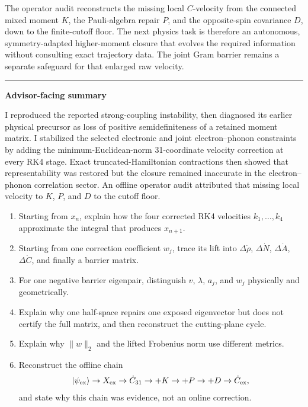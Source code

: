 \documentclass[10pt,letterpaper,twocolumn]{article}
\newcommand{\segmenthead}[1]{%
  \Needspace{5\baselineskip}%
  \par\medskip{\color{navy}\large\bfseries #1}\par
  \vspace{-2pt}{\color{navy}\rule{\columnwidth}{0.7pt}}\par\smallskip
}
\newcommand{\teachbox}[2]{%
  \par\smallskip
  \noindent\begin{minipage}{\columnwidth}
    {\color{#1}\rule{\columnwidth}{1.0pt}}\par\vspace{-1pt}
    \small\textbf{\color{#1}#2}\par\smallskip\color{black}
}
\newcommand{\closeteachbox}{%
  \par\vspace{1pt}{\color{navy!35}\rule{\columnwidth}{0.35pt}}
  \end{minipage}\par\smallskip
}
\begin{document}
The operator audit reconstructs the missing local \(C\)-velocity from the
connected mixed moment \(K\), the Pauli-algebra repair \(P\), and the
opposite-spin covariance \(D\), down to the finite-cutoff floor.  The next
physics task is therefore an autonomous, symmetry-adapted higher-moment
closure that evolves the required information without consulting exact
trajectory data.  The joint Gram barrier remains a separate safeguard for
that enlarged raw velocity.

\teachbox{green}{Advisor-facing summary}
I reproduced the reported strong-coupling instability, then diagnosed its
earlier physical precursor as loss of positive semidefiniteness of a retained
moment matrix.  I stabilized the selected electronic and joint
electron--phonon constraints by adding the minimum-Euclidean-norm
31-coordinate velocity correction at every RK4 stage.  Exact
truncated-Hamiltonian contractions then showed that representability was
restored but the closure remained inaccurate in the electron--phonon
correlation sector.  An offline operator audit attributed that missing local
velocity to \(K\), \(P\), and \(D\) to the cutoff floor.
\closeteachbox

\segmenthead{Questions for later oral review}

\begin{enumerate}
  \item Starting from \(x_n\), explain how the four corrected RK4 velocities
  \(k_1,\ldots,k_4\) approximate the integral that produces \(x_{n+1}\).
  \item Starting from one correction coefficient \(w_j\), trace its lift into
  \(\Delta\dot\rho\), \(\Delta\dot N\), \(\Delta\dot A\),
  \(\Delta\dot C\), and finally a barrier matrix.
  \item For one negative barrier eigenpair, distinguish \(v\), \(\lambda\),
  \(a_j\), and \(w_j\) physically and geometrically.
  \item Explain why one half-space repairs one exposed eigenvector but does
  not certify the full matrix, and then reconstruct the cutting-plane cycle.
  \item Explain why \(\lVert w\rVert_2\) and the lifted Frobenius norm use
  different metrics.
  \item Reconstruct the offline chain
  \[
  |\psi_{\rm ex}\rangle\to X_{\rm ex}
  \to\dot C_{31}\to +K\to+P\to+D
  \to\dot C_{\rm ex},
  \]
  and state why this chain was evidence, not an online correction.
\end{enumerate}
\end{document}
